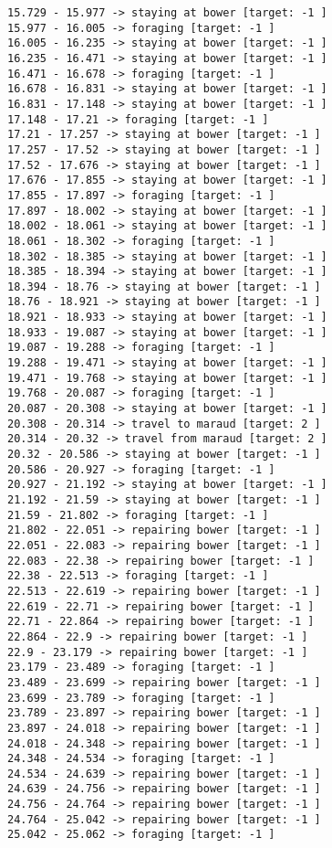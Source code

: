 \documentclass[11pt]{article}
\begin{document}
\begin{Verbatim}[commandchars=\\\{\}]
15.729 - 15.977 -> staying at bower [target: -1 ]
15.977 - 16.005 -> foraging [target: -1 ]
16.005 - 16.235 -> staying at bower [target: -1 ]
16.235 - 16.471 -> staying at bower [target: -1 ]
16.471 - 16.678 -> foraging [target: -1 ]
16.678 - 16.831 -> staying at bower [target: -1 ]
16.831 - 17.148 -> staying at bower [target: -1 ]
17.148 - 17.21 -> foraging [target: -1 ]
17.21 - 17.257 -> staying at bower [target: -1 ]
17.257 - 17.52 -> staying at bower [target: -1 ]
17.52 - 17.676 -> staying at bower [target: -1 ]
17.676 - 17.855 -> staying at bower [target: -1 ]
17.855 - 17.897 -> foraging [target: -1 ]
17.897 - 18.002 -> staying at bower [target: -1 ]
18.002 - 18.061 -> staying at bower [target: -1 ]
18.061 - 18.302 -> foraging [target: -1 ]
18.302 - 18.385 -> staying at bower [target: -1 ]
18.385 - 18.394 -> staying at bower [target: -1 ]
18.394 - 18.76 -> staying at bower [target: -1 ]
18.76 - 18.921 -> staying at bower [target: -1 ]
18.921 - 18.933 -> staying at bower [target: -1 ]
18.933 - 19.087 -> staying at bower [target: -1 ]
19.087 - 19.288 -> foraging [target: -1 ]
19.288 - 19.471 -> staying at bower [target: -1 ]
19.471 - 19.768 -> staying at bower [target: -1 ]
19.768 - 20.087 -> foraging [target: -1 ]
20.087 - 20.308 -> staying at bower [target: -1 ]
20.308 - 20.314 -> travel to maraud [target: 2 ]
20.314 - 20.32 -> travel from maraud [target: 2 ]
20.32 - 20.586 -> staying at bower [target: -1 ]
20.586 - 20.927 -> foraging [target: -1 ]
20.927 - 21.192 -> staying at bower [target: -1 ]
21.192 - 21.59 -> staying at bower [target: -1 ]
21.59 - 21.802 -> foraging [target: -1 ]
21.802 - 22.051 -> repairing bower [target: -1 ]
22.051 - 22.083 -> repairing bower [target: -1 ]
22.083 - 22.38 -> repairing bower [target: -1 ]
22.38 - 22.513 -> foraging [target: -1 ]
22.513 - 22.619 -> repairing bower [target: -1 ]
22.619 - 22.71 -> repairing bower [target: -1 ]
22.71 - 22.864 -> repairing bower [target: -1 ]
22.864 - 22.9 -> repairing bower [target: -1 ]
22.9 - 23.179 -> repairing bower [target: -1 ]
23.179 - 23.489 -> foraging [target: -1 ]
23.489 - 23.699 -> repairing bower [target: -1 ]
23.699 - 23.789 -> foraging [target: -1 ]
23.789 - 23.897 -> repairing bower [target: -1 ]
23.897 - 24.018 -> repairing bower [target: -1 ]
24.018 - 24.348 -> repairing bower [target: -1 ]
24.348 - 24.534 -> foraging [target: -1 ]
24.534 - 24.639 -> repairing bower [target: -1 ]
24.639 - 24.756 -> repairing bower [target: -1 ]
24.756 - 24.764 -> repairing bower [target: -1 ]
24.764 - 25.042 -> repairing bower [target: -1 ]
25.042 - 25.062 -> foraging [target: -1 ]

\end{Verbatim}
\end{document}
